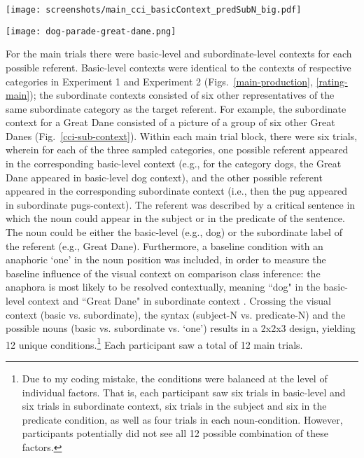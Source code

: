 \begin{figure*}[t]
	\begin{center}
		\texttt{[image: screenshots/main\_cci\_basicContext\_predSubN\_big.pdf]}
	\end{center}
	\vspace{-0.5cm}
	\caption{Example view of a comparison class inference main trial: Participants paraphrased the critical utterance with a subordinate noun in predicate position, which appeared in basic-level context, describing a large-subordinate target.}
	\label{main-cci}
\end{figure*}
\begin{figure*}[h]
	\begin{center}
		\texttt{[image: dog-parade-great-dane.png]}
	\end{center}
	\caption{Example view of a subordinate context: For the category Great Danes, the context depicts six different Great Danes.}
	\label{cci-sub-context}
\end{figure*}
For the main trials there were basic-level and subordinate-level contexts for each possible referent. Basic-level contexts were identical to the contexts of respective categories in Experiment 1 and Experiment 2 (Figs.~\ref{main-production}, \ref{rating-main}); the subordinate contexts consisted of six other representatives of the same subordinate category as the target referent. For example, the subordinate context for a Great Dane consisted of a picture of a group of six other Great Danes (Fig.~\ref{cci-sub-context}). Within each main trial block, there were six trials, wherein for each of the three sampled categories, one possible referent appeared in the corresponding basic-level context (e.g., for the category dogs, the Great Dane appeared in basic-level dog context), and the other possible referent appeared in the corresponding subordinate context (i.e., then the pug appeared in subordinate pugs-context). 
The referent was described by a critical sentence in which the noun could appear in the subject or in the predicate of the sentence. The noun could be either the basic-level (e.g., dog) or the subordinate label of the referent (e.g., Great Dane). Furthermore, a baseline condition with an anaphoric ‘one’ in the noun position was included, in order to measure the baseline influence of the visual context on comparison class inference: the anaphora is most likely to be resolved contextually, meaning ``dog" in the basic-level context and ``Great Dane" in subordinate context \parencite{goldberg2017one}. Crossing the visual context (basic vs. subordinate), the syntax (subject-N vs. predicate-N) and the possible nouns (basic vs. subordinate vs. ‘one’) results in a 2x2x3 design, yielding 12 unique conditions.\footnote{Due to my coding mistake, the conditions were balanced at the level of individual factors. That is, each participant saw six trials in basic-level and six trials in subordinate context, six trials in the subject and six in the predicate condition, as well as four trials in each noun-condition. However, participants potentially did not see all 12 possible combination of these factors.}
Each participant saw a total of 12 main trials.   

